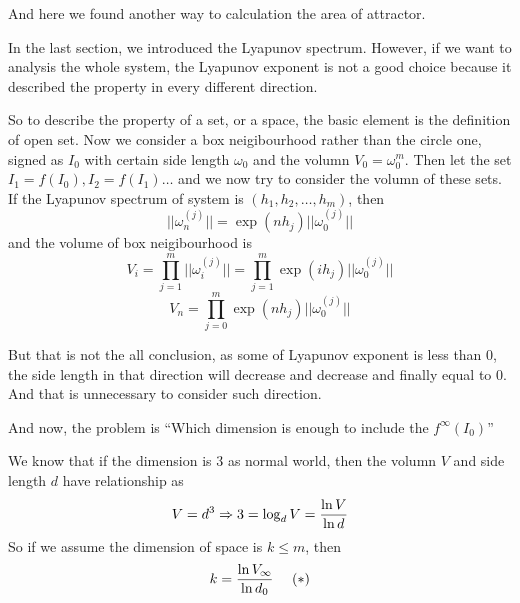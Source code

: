 \documentclass[12pt]{article}
\theoremstyle{plain}
\begin{document}
And here we found another way to calculation the area of attractor.




In the last section, we introduced the Lyapunov spectrum. However, if we want to analysis the whole system, the Lyapunov exponent is not a good choice because it described the property in every different direction.

So to describe the property of a set, or a space, the basic element is the definition of open set. Now we consider a box neigibourhood rather than the circle one, signed as $I_0$ with certain side length $\omega_0$ and the volumn $V_0 = \omega_0^m$. Then let the set $I_1 = f(I_0), I_2 = f(I_1) \ldots$ and we now try to consider the volumn of these sets. If the Lyapunov spectrum of system is $(h_1, h_2, \ldots, h_m)$, then
$$
||\omega_n^{(j)}|| = \exp(nh_j)||\omega_0^{(j)}||
$$
and the volume of box neigibourhood is 
$$
V_i= \prod_{j = 1}^{m}||\omega_i^{(j)}|| = \prod_{j = 1}^{m}\exp(ih_j)||\omega_0^{(j)}||
$$
$$
V_n = \prod_{j = 0}^{m}\exp(nh_j)||\omega_0^{(j)}||
$$

But that is not the all conclusion, as some of Lyapunov exponent is less than 0, the side length in that direction will decrease and decrease and finally equal to 0. And that is unnecessary to consider such direction.

And now, the problem is ``Which dimension is enough to include the $f^\infty(I_0)$''

We know that if the dimension is $3$ as normal world, then the volumn $V$ and side length $d$ have relationship as 
$$
V = d^3 \Rightarrow 3 = \log_d V = {\ln V \over \ln d}
$$
So if we assume the dimension of space is $k \leq m$, then 
$$
k = {\ln V_\infty \over \ln d_0} \ \ \ \ (*)
$$
\end{document}
